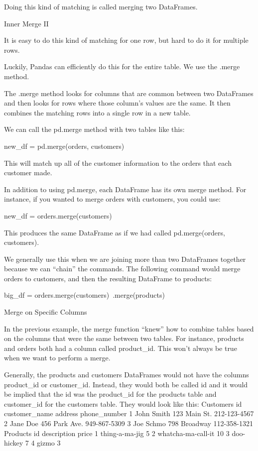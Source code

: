 \documentclass{journal}
\begin{document}
Doing this kind of matching is called merging two DataFrames.


Inner Merge II

It is easy to do this kind of matching for one row, but hard to do it for multiple rows.

Luckily, Pandas can efficiently do this for the entire table. We use the .merge method.

The .merge method looks for columns that are common between two DataFrames and then looks for rows where those column’s values are the same. It then combines the matching rows into a single row in a new table.

We can call the pd.merge method with two tables like this:

new_df = pd.merge(orders, customers)

This will match up all of the customer information to the orders that each customer made.

In addition to using pd.merge, each DataFrame has its own merge method. For instance, if you wanted to merge orders with customers, you could use:

new_df = orders.merge(customers)

This produces the same DataFrame as if we had called pd.merge(orders, customers).

We generally use this when we are joining more than two DataFrames together because we can “chain” the commands. The following command would merge orders to customers, and then the resulting DataFrame to products:

big_df = orders.merge(customers)\
    .merge(products)


Merge on Specific Columns

In the previous example, the merge function “knew” how to combine tables based on the columns that were the same between two tables. For instance, products and orders both had a column called product_id. This won’t always be true when we want to perform a merge.

Generally, the products and customers DataFrames would not have the columns product_id or customer_id. Instead, they would both be called id and it would be implied that the id was the product_id for the products table and customer_id for the customers table. They would look like this:
Customers
id	customer_name	address	phone_number
1	John Smith	123 Main St.	212-123-4567
2	Jane Doe	456 Park Ave.	949-867-5309
3	Joe Schmo	798 Broadway	112-358-1321
Products
id	description	price
1	thing-a-ma-jig	5
2	whatcha-ma-call-it	10
3	doo-hickey	7
4	gizmo	3
\end{document}
